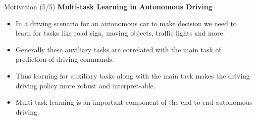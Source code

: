 \documentclass[aspectratio=169]{beamer}
\begin{document}
\begin{frame}{Motivation (5/5)}
\textbf{Multi-task Learning in Autonomous Driving}
   \begin{itemize}
        \item In a driving scenario for an autonomous car to make decision we need to learn for tasks like road sign, moving objects, traffic lights and more.
        \item Generally these auxiliary tasks are correlated with the main task of prediction of driving commands.
       \item Thus learning for auxiliary tasks  along with the main task makes the driving driving policy more robust and interpret-able.
       \item Multi-task learning is an important component of the end-to-end autonomous driving.
   \end{itemize}
\end{frame}
\end{document}
